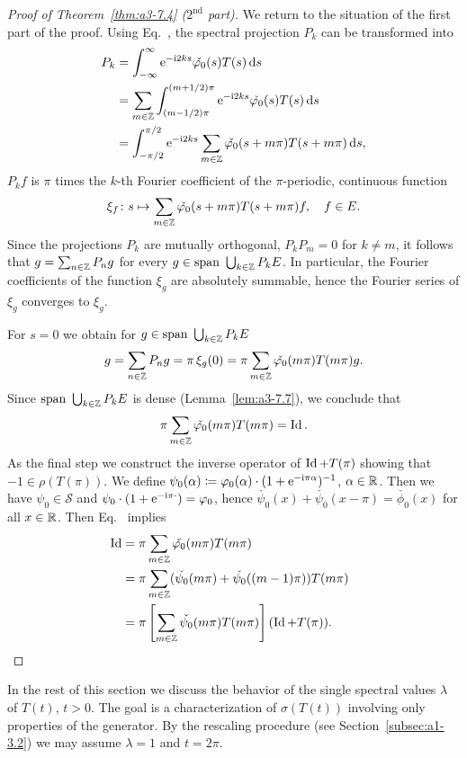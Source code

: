 \begin{proof}[Proof of Theorem~\ref{thm:a3-7.4} ($ 2^{\text{nd}} $ part)]
We return to the situation of the first part of the proof.
Using Eq.~, the spectral projection $P_{k}$ can be transformed into
\begin{align*}
P_{k} &= \int_{-\infty}^{\infty} \eu^{-\im 2ks}\check{\phi_{0}}(s)T(s)\ds \\
&= \sum_{m\in\Z} \int_{(m-1/2)\pi}^{(m+1/2)\pi} \eu^{-\im 2ks}\check{\phi_{0}}(s)T(s)\ds \\
&= \int_{-\pi/2}^{\pi/2} \eu^{-\im 2ks}\sum_{m\in\Z}\check{\phi_{0}}(s+m\pi)T(s+m\pi)\ds ,
\end{align*}
\ie $P_{k}f$ is $\pi$ times the $k$-th Fourier coefficient of the $\pi$-periodic, continuous function 
\[
\xi_{f} \colon s \mapsto \sum_{m\in\Z} \check{\phi_{0}}(s+m\pi)T(s+m\pi)f, \quad f \in E .
\]
Since the projections $P_{k}$ are mutually orthogonal, \ie $P_{k}P_{m} = 0$ for $k \neq m$, it follows that $g = \sum_{n\in\mathbb{Z}} P_{n}g$ for every $g \in \text{span }\bigcup_{k\in\mathbb{Z}} P_{k}E$.
In particular, the Fourier coefficients of the function $\xi_{g}$ are absolutely summable, hence the Fourier series of\/ $\xi_{g}$ converges to $\xi_g$.

For $s = 0$ we obtain for 
$g \in \text{span }\bigcup_{k\in\mathbb{Z}} P_{k}E$
\[
g = \sum_{n\in\Z} P_{n}g = \pi\,\xi_{g}(0) = \pi\sum_{m\in\Z} \check{\phi_{0}}(m\pi)T(m\pi)g .
\]
Since $\text{span }\bigcup_{k\in\mathbb{Z}} P_{k}E$ is dense (Lemma~\ref{lem:a3-7.7}), we conclude that
\begin{equation}\label{eq:a3-7.6}
\pi\sum_{m\in\Z} \check{\phi_{0}}(m\pi)T(m\pi) = \Id .
\end{equation}
As the final step we construct the inverse operator of\/ $\operatorname{Id} + T(\pi)$ showing that $-1 \in \rho(T(\pi))$.
We define $\psi_{0}(\alpha) \coloneq \phi_{0}(\alpha)\cdot(1 + \eu^{-\im\pi\alpha})^{-1}$, $\alpha \in \mathbb{R}$.
Then we have $\psi_{0} \in \mathcal{S}$ and $\psi_{0}\cdot(1 + \eu^{-\im\pi\cdot}) = \phi_{0}$,
hence $\check{\psi_{0}}(x) + \check{\psi_{0}}(x - \pi) = \check{\phi_{0}}(x)$ for all $x \in \mathbb{R}$.
Then Eq.~ implies
\begin{align*}
\Id &= \pi\sum_{m\in\Z} \check{\phi_{0}}(m\pi)T(m\pi) \\
&= \pi\sum_{m\in\Z} (\check{\psi_{0}}(m\pi) + \check{\psi_{0}}((m-1)\pi))T(m\pi) \\
&= \pi\left[ \sum_{m\in\Z} \check{\psi_{0}}(m\pi)T(m\pi) \right] (\Id + T(\pi)) . \tag*{\qedsymbol}%
\end{align*}
\let\qedsymbol\relax
\end{proof}
In the rest of this section we discuss the behavior of the single spectral values $\lambda$ of\/ $T(t)$, $t > 0$.
The goal is a characterization of\/ $\sigma(T(t))$ involving only properties of the generator.
By the rescaling procedure (see Section~\ref{subsec:a1-3.2}) we may assume $\lambda = 1$ and $t = 2\pi$.

